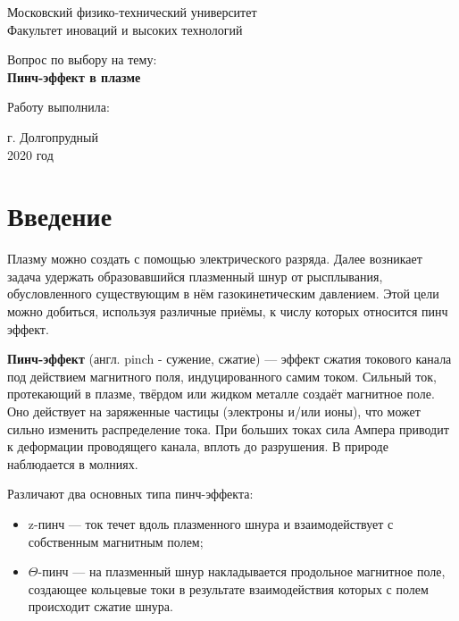 \documentclass[12pt]{kiarticle} %
\begin{document}
	
	\begin{titlepage}
		\begin{center}
			\large 	Московский физико-технический университет \\
			Факультет иноваций и высоких технологий \\
			\vspace{0.2cm}
			
			\vspace{4.5cm}
			Вопрос по выбору на тему: \\ \vspace{0.2cm}
			\LARGE \textbf{Пинч-эффект в плазме}
		\end{center}
		\vspace{2.3cm} \large
		
		\begin{center}
			Работу выполнила: \\


			\vspace{10mm}
			
			
			
			
		\end{center}
		
		\begin{center} \vspace{60mm}
			г. Долгопрудный \\
			2020 год
		\end{center}
	\end{titlepage}
	
	
	\section{Введение}
	Плазму можно создать с помощью электрического разряда. Далее возникает задача удержать образовавшийся плазменный шнур от рысплывания, обусловленного существующим в нём газокинетическим давлением. Этой цели можно добиться, используя различные приёмы, к числу которых относится пинч эффект.
	\par \textbf{Пинч-эффект} (англ. pinch - сужение, сжатие) --- эффект сжатия токового канала под действием магнитного поля, индуцированного самим током. Сильный ток, протекающий в плазме, твёрдом или жидком металле создаёт магнитное поле. Оно действует на заряженные частицы (электроны и/или ионы), что может сильно изменить распределение тока. При больших токах сила Ампера приводит к деформации проводящего канала, вплоть до разрушения. В природе наблюдается в молниях.
	\par Различают два основных типа пинч-эффекта:
	\begin{itemize}
		\item z-пинч --- ток течет вдоль плазменного шнура и взаимодействует с собственным магнитным полем;
		\item $\Theta$-пинч --- на плазменный шнур накладывается продольное магнитное поле, создающее кольцевые токи в результате взаимодействия которых с полем происходит сжатие шнура.
	\end{itemize}
	
\end{document}
